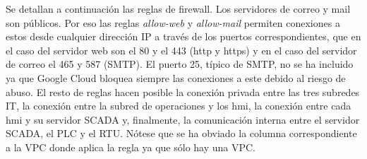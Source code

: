   Se detallan a continuación las reglas de firewall. Los servidores de correo y mail son públicos. Por eso las reglas \textit{allow-web} y \textit{allow-mail} permiten conexiones a estos desde cualquier dirección IP a través de los puertos correspondientes, que en el caso del servidor web son el 80 y el 443 (http y https) y en el caso del servidor de correo el 465 y 587 (SMTP). El puerto 25, típico de SMTP, no se ha incluido ya que Google Cloud bloquea siempre las conexiones a este debido al riesgo de abuso. El resto de reglas hacen posible la conexión privada entre las tres subredes IT, la conexión entre la subred de operaciones y los hmi, la conexión entre cada hmi y su servidor SCADA y, finalmente, la comunicación interna entre el servidor SCADA, el PLC y el RTU. Nótese que se ha obviado la columna correspondiente a la VPC donde aplica la regla ya que sólo hay una VPC.


